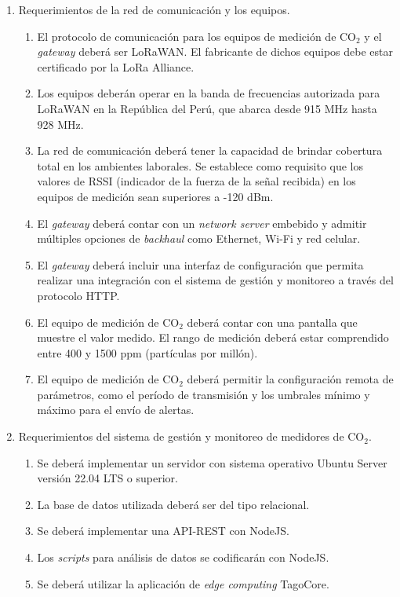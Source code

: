 \documentclass[
11pt, %
]{charter}
\begin{document}
\begin{enumerate}
	\item Requerimientos de la red de comunicación y los equipos.
		\begin{enumerate}
			\item El protocolo de comunicación para los equipos de medición de CO$_{2}$ y el \textit{gateway} deberá ser LoRaWAN. El fabricante de dichos equipos debe estar certificado por la LoRa Alliance.
			\item Los equipos deberán operar en la banda de frecuencias autorizada para LoRaWAN en la República del Perú, que abarca desde 915 MHz hasta 928 MHz. 
			 \item La red de comunicación deberá tener la capacidad de brindar cobertura total en los ambientes laborales. Se establece como requisito que los valores de RSSI (indicador de la fuerza de la señal recibida) en los equipos de medición sean superiores a -120 dBm.
			\item El \textit{gateway} deberá contar con un \textit{network server} embebido y admitir múltiples opciones de \textit{backhaul} como Ethernet, Wi-Fi y red celular.
			\item El \textit{gateway} deberá incluir una interfaz de configuración que permita realizar una integración con el sistema de gestión y monitoreo a través del protocolo HTTP.
			\item El equipo de medición de CO$_{2}$ deberá contar con una pantalla que muestre el valor medido. El rango de medición deberá estar comprendido entre 400 y 1500 ppm (partículas por millón).
			\item El equipo de medición de CO$_{2}$ deberá permitir la configuración remota de parámetros, como el período de transmisión y los umbrales mínimo y máximo para el envío de alertas.	
		\end{enumerate}
	\item Requerimientos del sistema de gestión y monitoreo de medidores de CO$_{2}$.
		\begin{enumerate}
			\item Se deberá implementar un servidor con sistema operativo Ubuntu Server versión 22.04 LTS o superior.
			\item La base de datos utilizada deberá ser del tipo relacional.
			\item Se deberá implementar una API-REST con  NodeJS.
			\item Los \textit{scripts} para análisis de datos se codificarán con NodeJS.
			\item Se deberá utilizar la aplicación de \textit{edge computing} TagoCore. 

\end{enumerate}
\end{enumerate}
\end{document}
